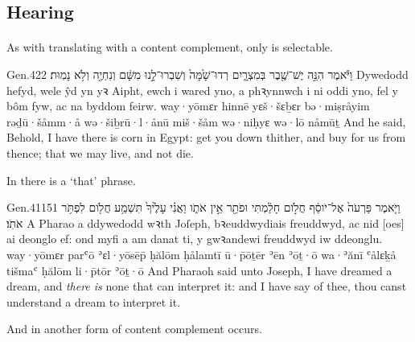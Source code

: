 \subsection{Hearing}


\begin{paper}
	\tounfold{***}
\end{paper}



\paragraph{}


\begin{paper}
	As with  translating  with a content complement, only  is selectable.
\end{paper}

\begin{example}{Gen.}{42}{2}{}{}
	\quoling
	{וַיֹּ֕אמֶר הִנֵּ֣ה   יֶשׁ־שֶׁ֖בֶר בְּמִצְרָ֑יִם רְדוּ־שָׁ֙מָּה֙ וְשִׁבְרוּ־לָ֣נוּ מִשָּׁ֔ם וְנִחְיֶ֖ה וְלֹ֥א נָמֽוּת׃}
	{Dywedodd hefyd, wele   ŷd yn yꝛ Aipht, ewch i wared yno, a phꝛynnwch i ni oddi yno, fel y bôm fyw, ac na byddom feirw.}
	{way·yōmɛr hinnē   yɛš·šɛḇɛr bə·miṣråyim rəḏū·šåmm·å wə·šiḇrū·l·ånū miš·šåm wə·niḥyɛ wə·lō nåmūṯ}
	{And he said, Behold, I have   there is corn in Egypt: get you down thither, and buy for us from thence; that we may live, and not die.}
\end{example}
\begin{paper}
	\explain In  there is a  ‘that’ phrase.
\end{paper}

\begin{example}{Gen.}{41}{15}{1}{}
	\quoling
	{וַיֹּ֤אמֶר פַּרְעֹה֙ אֶל־יֹוסֵ֔ף חֲלֹ֣ום חָלַ֔מְתִּי וּפֹתֵ֖ר אֵ֣ין אֹתֹ֑ו וַאֲנִ֗י  עָלֶ֙יךָ֙  תִּשְׁמַ֥ע חֲלֹ֖ום לִפְתֹּ֥ר אֹתֹֽו׃}
	{A Pharao a ddywedodd wꝛth Joſeph, bꝛeuddwydiais freuddwyd, ac nid [oes] ai deonglo ef: ond myfi a   am danat ti, y gwꝛandewi freuddwyd iw ddeonglu.}
	{way·yōmɛr parʿō ʾɛl·yōsēp̄ ḥălōm ḥålamtī ū·p̄ōṯēr ʾēn ʾōṯ·ō wa·ʾănī  ʿålɛḵå  tišmaʿ ḥălōm li·p̄tōr ʾōṯ·ō}
	{And Pharaoh said unto Joseph, I have dreamed a dream, and \emph{there is} none that can interpret it: and I have  say of thee,  thou canst understand a dream to interpret it.}
\end{example}
\begin{paper}
	\explain And in  another form of content complement occurs.
\end{paper}



